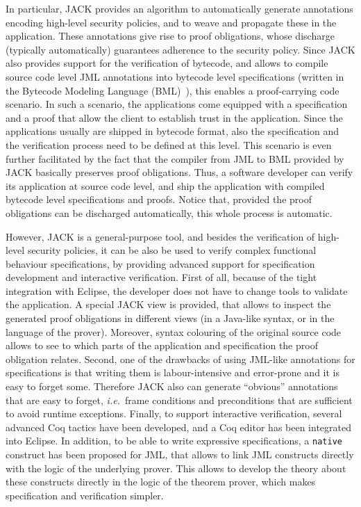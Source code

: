 In particular, JACK provides an algorithm to automatically generate
annotations encoding high-level security policies, and to weave and
propagate these in the application. These annotations give rise to
proof obligations, whose discharge (typically automatically)
guarantees adherence to the security policy. Since JACK also provides
support for the verification of bytecode, and allows to compile source
code level JML annotations into bytecode level specifications (written
in the Bytecode Modeling Language (BML)~\cite{BurdyHP07}), this
enables a proof-carrying code scenario. In such a scenario, the
applications come equipped with a specification and a proof that allow
the client to establish trust in the application. Since the
applications usually are shipped in bytecode format, also the
specification and the verification process need to be defined at this
level. This scenario is even further facilitated by the fact that the
compiler from JML to BML provided by JACK basically preserves proof
obligations. Thus, a software developer can verify its application at
source code level, and ship the application with compiled bytecode
level specifications and proofs. Notice that, provided the proof
obligations can be discharged automatically, this whole process is
automatic.

However, JACK is a general-purpose tool, and besides the verification
of high-level security policies, it can be also be used to verify
complex functional behaviour specifications, by providing advanced
support for specification development and interactive
verification. First of all, because of the tight integration with
Eclipse, the developer does not have to change tools to validate the
application. A special JACK view is provided, that allows to inspect
the generated proof obligations in different views (in a Java-like
syntax, or in the language of the prover). Moreover, syntax colouring
of the original source code allows to see to which parts of the
application and specification the proof obligation relates. Second,
one of the drawbacks of using JML-like annotations for specifications
is that writing them is labour-intensive and error-prone and it is
easy to forget some. Therefore JACK also can generate ``obvious''
annotations that are easy to forget, \emph{i.e.}\ frame conditions and
preconditions that are sufficient to avoid runtime
exceptions. Finally, to support interactive verification, several
advanced Coq tactics have been developed, and a Coq editor has been
integrated into Eclipse. In addition, to be able to write expressive
specifications, a
\texttt{native} construct has been proposed for JML, that allows to
link JML constructs directly with the logic of the underlying
prover. This allows to develop the theory about these constructs
directly in the logic of the theorem prover, which makes specification
and verification simpler.


